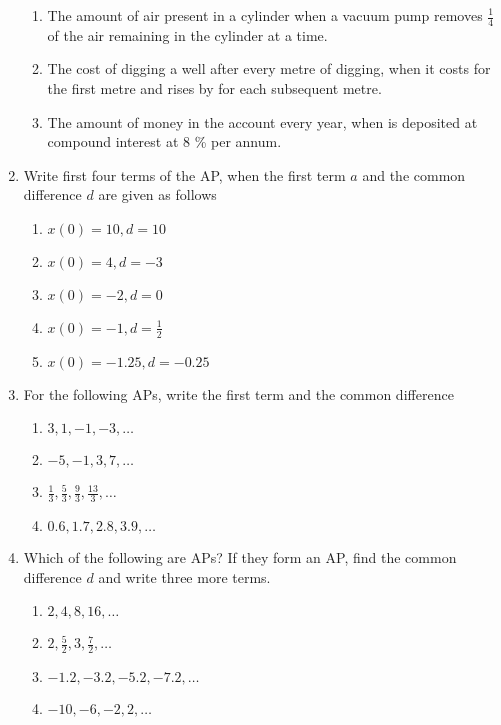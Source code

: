 \begin{enumerate}[label=\thesubsection.\arabic*, ref=\thesubsection.\theenumi]
\begin{enumerate}
\item The amount of air present in a cylinder when a vacuum pump removes 
$\frac{1}{4}$ of the air remaining in the cylinder at a time.
\item  The cost of digging a well after every metre of digging,  when it costs  for the first metre and rises by  for each subsequent metre.
\item The amount of money in the account every year,  when  is deposited at compound interest at 8 \% per annum.
\end{enumerate}
\item Write first four terms of the AP,  when the first term $a$ and the common difference $d$ are
given as follows
		\begin{multicols}{2}
\begin{enumerate}
\item $x(0) = 10,  d = 10	$	
\item $x(0) = 4,  d = -3	$	
\item $x(0) = -2,  d = 0	$	
\item $ x(0) = -1,  d =\frac{1}{2}$
\item $x(0) = -1.25,  d = -0.25$	
\end{enumerate}
\end{multicols}
\item For the following APs,  write the first term and the common difference
	\begin{multicols}{2}
		\begin{enumerate}[itemsep=1ex]
\item $3,  1,  -1,  -3,  \dots $
\item $-5,  -1,  3,  7,  \dots $
\item $\frac{1}{3},  \frac{5}{3},  \frac{9}{3},  \frac{13}{3}, \dots $
\item $0.6,  1.7,  2.8,  3.9, \dots $ 
\end{enumerate}
\end{multicols}
\item Which of the following are APs? If they form an AP,  find the common difference $d$ and
write three more terms.
\begin{multicols}{2}
\begin{enumerate}[itemsep=1ex]
\item $2,  4,  8,  16,  \dots $
\item $2, \frac{5}{2},  3,  \frac{7}{2}, \dots $
\item $-1.2,  -3.2,  -5.2,  -7.2,  \dots $
\item $-10,  -6,  -2,  2,  \dots $

\end{enumerate}
\end{multicols}
\end{enumerate}
